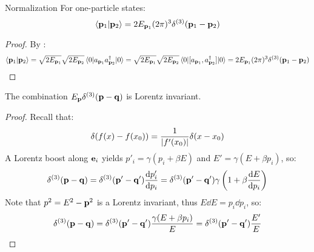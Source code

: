 \begin{proposition}{Normalization}{}
  For one-particle states:
  \begin{equation}
    \braket{\mathbf{p}_1 | \mathbf{p}_2} = 2E_{\mathbf{p}_1} (2\pi)^3 \delta^{(3)}(\mathbf{p}_1 - \mathbf{p}_2)
    \label{eq:scal-rel-norm}
  \end{equation}
\end{proposition}

\begin{proofbox}
  \begin{proof}
    By :
    \begin{equation*}
      \braket{\mathbf{p}_1 | \mathbf{p}_2} = \sqrt{2E_{\mathbf{p}_1}} \sqrt{2E_{\mathbf{p}_2}} \braket{0 | a_{\mathbf{p}_1} a_{\mathbf{p}_2}^\dagger | 0}
      = \sqrt{2E_{\mathbf{p}_1}} \sqrt{2E_{\mathbf{p}_2}} \braket{0 | [a_{\mathbf{p}_1} , a_{\mathbf{p}_2}^\dagger] | 0} = 2E_{\mathbf{p}_1} (2\pi)^3 \delta^{(3)}(\mathbf{p}_1 - \mathbf{p}_2)
    \end{equation*}
  \end{proof}
\end{proofbox}

\begin{lemma}{}{}
  The combination $ E_{\mathbf{p}} \delta^{(3)}(\mathbf{p} - \mathbf{q}) $ is Lorentz invariant.
\end{lemma}

\begin{proofbox}
  \begin{proof}
    Recall that:
    \begin{equation}
      \delta(f(x) - f(x_0)) = \frac{1}{\left\lvert f'(x_0)\right\rvert} \delta(x - x_0)
    \end{equation}
    A Lorentz boost along $ \mathbf{e}_i $ yields $ p'_i = \gamma (p_i + \beta E) $ and $ E' = \gamma (E + \beta p_i) $, so:
    \begin{equation*}
        \delta^{(3)}(\mathbf{p} - \mathbf{q})
        = \delta^{(3)}(\mathbf{p}' - \mathbf{q}') \frac{\mathrm{d} p'_i}{\mathrm{d} p_i}
        = \delta^{(3)}(\mathbf{p}' - \mathbf{q}') \gamma \left( 1 + \beta \frac{\mathrm{d} E}{\mathrm{d} p_i} \right)
    \end{equation*}
    Note that $ p^2 = E^2 - \mathbf{p}^2 $ is a Lorentz invariant, thus $ E \dd E = p_i \dd p_i $, so:
    \begin{equation*}
      \delta^{(3)}(\mathbf{p} - \mathbf{q})
      = \delta^{(3)}(\mathbf{p}' - \mathbf{q}') \frac{\gamma (E + \beta p_i)}{E}
      = \delta^{(3)}(\mathbf{p}' - \mathbf{q}') \frac{E'}{E}
    \end{equation*}
  \end{proof}
\end{proofbox}

